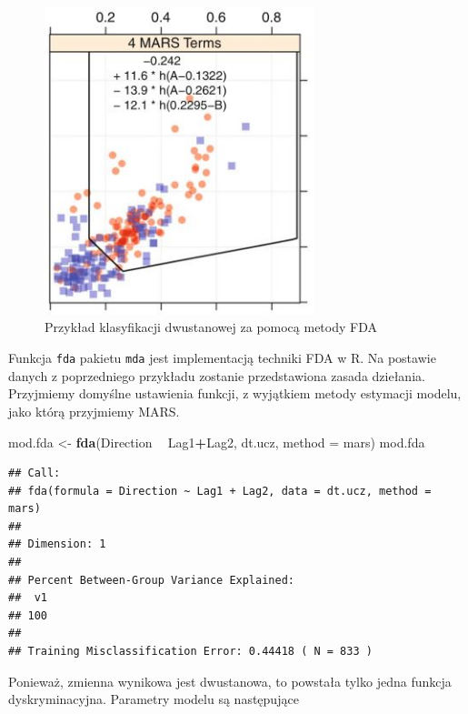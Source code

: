 \documentclass[
]{book}
\newenvironment{Shaded}{\begin{snugshade}}{\end{snugshade}}
\newcommand{\DataTypeTok}[1]{\textcolor[rgb]{0.13,0.29,0.53}{#1}}
\newcommand{\KeywordTok}[1]{\textcolor[rgb]{0.13,0.29,0.53}{\textbf{#1}}}
\newcommand{\NormalTok}[1]{#1}
\newcommand{\OperatorTok}[1]{\textcolor[rgb]{0.81,0.36,0.00}{\textbf{#1}}}
\newcommand{\StringTok}[1]{\textcolor[rgb]{0.31,0.60,0.02}{#1}}
\theoremstyle{plain}
\theoremstyle{definition}
\theoremstyle{definition}
\theoremstyle{definition}
\theoremstyle{definition}
\theoremstyle{remark}
\let\BeginKnitrBlock\begin \let\EndKnitrBlock\end
\begin{document}
\begin{figure}

{\centering \includegraphics[width=3.09in]{images/fda} 

}

\caption{Przykład klasyfikacji dwustanowej za pomocą metody FDA}\label{fig:fda}
\end{figure}

\BeginKnitrBlock{example}
\protect\hypertarget{exm:przykFDA}{}{\label{exm:przykFDA} }Funkcja \texttt{fda} pakietu \texttt{mda} jest implementacją techniki FDA w R. Na postawie danych z poprzedniego przykładu zostanie przedstawiona zasada dziełania. Przyjmiemy domyślne ustawienia funkcji, z wyjątkiem metody estymacji modelu, jako którą przyjmiemy MARS.
\EndKnitrBlock{example}

\begin{Shaded}
\begin{Highlighting}[]
\NormalTok{mod.fda <-}\StringTok{ }\KeywordTok{fda}\NormalTok{(Direction }\OperatorTok{~}\StringTok{ }\NormalTok{Lag1}\OperatorTok{+}\NormalTok{Lag2, dt.ucz, }\DataTypeTok{method =}\NormalTok{ mars)}
\NormalTok{mod.fda}
\end{Highlighting}
\end{Shaded}

\begin{verbatim}
## Call:
## fda(formula = Direction ~ Lag1 + Lag2, data = dt.ucz, method = mars)
## 
## Dimension: 1 
## 
## Percent Between-Group Variance Explained:
##  v1 
## 100 
## 
## Training Misclassification Error: 0.44418 ( N = 833 )
\end{verbatim}

Ponieważ, zmienna wynikowa jest dwustanowa, to powstała tylko jedna funkcja dyskryminacyjna.
Parametry modelu są następujące
\end{document}
